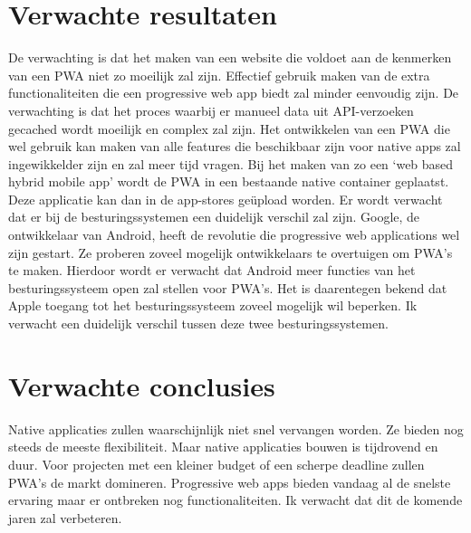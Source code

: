 \section{Verwachte resultaten}
\label{sec:verwachte_resultaten}


De verwachting is dat het maken van een website die voldoet aan de kenmerken van een PWA niet zo moeilijk zal zijn. Effectief gebruik maken van de extra functionaliteiten die een progressive web app biedt zal minder eenvoudig zijn. De verwachting is dat het proces waarbij er manueel data uit API-verzoeken gecached wordt moeilijk en complex zal zijn.
Het ontwikkelen van een PWA die wel gebruik kan maken van alle features die beschikbaar zijn voor native apps zal ingewikkelder zijn en zal meer tijd vragen. 
Bij het maken van zo een ‘web based hybrid mobile app’  wordt de PWA in een bestaande native container geplaatst. Deze applicatie kan dan in de app-stores geüpload worden.
\autocite{Malavolta2016}
Er wordt verwacht dat er bij de besturingssystemen een duidelijk verschil zal zijn. 
Google, de ontwikkelaar van Android, heeft de revolutie die progressive web applications wel zijn gestart. Ze proberen zoveel mogelijk ontwikkelaars te overtuigen om PWA’s te maken. Hierdoor wordt er verwacht dat Android meer functies van het besturingssysteem open zal stellen voor PWA’s.
Het is daarentegen bekend dat Apple toegang tot het besturingssysteem zoveel mogelijk wil beperken. Ik verwacht een duidelijk verschil tussen deze twee besturingssystemen. 
\autocite{Hansen2017}




\section{Verwachte conclusies}
\label{sec:verwachte_conclusies}

Native applicaties zullen waarschijnlijk niet snel vervangen worden. Ze bieden nog steeds de meeste flexibiliteit. Maar native applicaties bouwen is tijdrovend en duur. 
Voor projecten met een kleiner budget of een scherpe deadline zullen PWA’s de markt domineren.
Progressive web apps bieden vandaag al de snelste ervaring maar er ontbreken nog functionaliteiten. Ik verwacht dat dit de komende jaren zal verbeteren.


